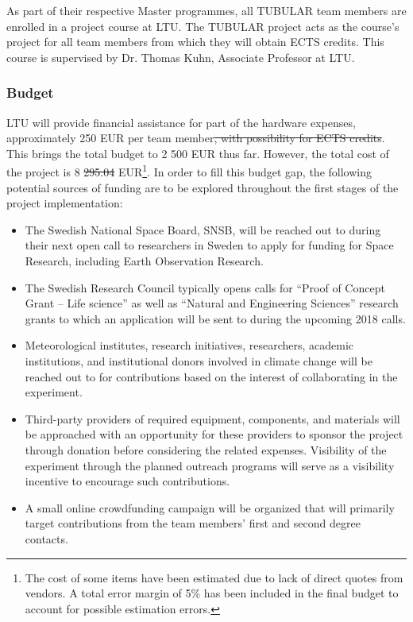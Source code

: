 \documentclass[a4paper,12pt,twoside]{article}
\providecommand{\DIFaddtex}[1]{{\protect\color{blue}\uwave{#1}}} %
\providecommand{\DIFdeltex}[1]{{\protect\color{red}\sout{#1}}}                      %
\providecommand{\DIFaddbegin}{} %
\providecommand{\DIFaddend}{} %
\providecommand{\DIFdelbegin}{} %
\providecommand{\DIFdelend}{} %
\providecommand{\DIFadd}[1]{\texorpdfstring{\DIFaddtex{#1}}{#1}} %
\providecommand{\DIFdel}[1]{\texorpdfstring{\DIFdeltex{#1}}{}} %
\newcommand{\DIFscaledelfig}{0.5}
\newlength{\DIFdelgraphicswidth} %
\newlength{\DIFdelgraphicsheight} %
\newcommand{\DIFaddincludegraphics}[2][]{{\color{blue}\fbox{\DIFOincludegraphics[#1]{#2}}}} %
\newcommand{\DIFdelincludegraphics}[2][]{%
\sbox{\DIFdelgraphicsbox}{\DIFOincludegraphics[#1]{#2}}%
\settoboxwidth{\DIFdelgraphicswidth}{\DIFdelgraphicsbox} %
\settoboxtotalheight{\DIFdelgraphicsheight}{\DIFdelgraphicsbox} %
\scalebox{\DIFscaledelfig}{%
\parbox[b]{\DIFdelgraphicswidth}{\usebox{\DIFdelgraphicsbox}\\[-\baselineskip] \rule{\DIFdelgraphicswidth}{0em}}\llap{\resizebox{\DIFdelgraphicswidth}{\DIFdelgraphicsheight}{%
\setlength{\unitlength}{\DIFdelgraphicswidth}%
\begin{picture}(1,1)%
\thicklines\linethickness{2pt} %
{\color[rgb]{1,0,0}\put(0,0){\framebox(1,1){}}}%
{\color[rgb]{1,0,0}\put(0,0){\line( 1,1){1}}}%
{\color[rgb]{1,0,0}\put(0,1){\line(1,-1){1}}}%
\end{picture}%
}\hspace*{3pt}}} %
} %
\DeclareRobustCommand{\DIFaddbegin}{\DIFOaddbegin \let\includegraphics\DIFaddincludegraphics} %
\DeclareRobustCommand{\DIFaddend}{\DIFOaddend \let\includegraphics\DIFOincludegraphics} %
\DeclareRobustCommand{\DIFdelbegin}{\DIFOdelbegin \let\includegraphics\DIFdelincludegraphics} %
\DeclareRobustCommand{\DIFdelend}{\DIFOaddend \let\includegraphics\DIFOincludegraphics} %
\begin{document}
As part of their respective Master programmes, all TUBULAR team members are enrolled in a project course at LTU. The TUBULAR project acts as the course's project for all team members from which they will obtain ECTS credits. This course is supervised by Dr. Thomas Kuhn, Associate Professor at LTU.

\pagebreak
\subsubsection{Budget}
LTU will provide financial assistance for part of the hardware expenses, approximately 250 EUR per team member\DIFdelbegin \DIFdel{, with possibility for ECTS credits}\DIFdelend . This brings the total budget to 2 500 EUR thus far. However, the total cost of the project is 8 \DIFdelbegin \DIFdel{295.04 }\DIFdelend \DIFaddbegin \DIFadd{376.65 }\DIFaddend EUR\footnote{The cost of some items have been estimated due to lack of direct quotes from vendors. A total error margin of 5\% has been included in the final budget to account for possible estimation errors.}. In order to fill this budget gap, the following potential sources of funding are to be explored throughout the first stages of the project implementation:

\begin{itemize}
    \item The Swedish National Space Board, SNSB, will be reached out to during their next open call to researchers in Sweden to apply for funding for Space Research, including Earth Observation Research.
    \item The Swedish Research Council typically opens calls for \enquote{Proof of Concept Grant – Life science} as well as \enquote{Natural and Engineering Sciences} research grants to which an application will be sent to during the upcoming 2018 calls.
    \item Meteorological institutes, research initiatives, researchers, academic institutions, and institutional donors involved in climate change will be reached out to for contributions based on the interest of collaborating in the experiment.
    \item Third-party providers of required equipment, components, and materials will be approached with an opportunity for these providers to sponsor the project through donation before considering the related expenses. Visibility of the experiment through the planned outreach programs will serve as a visibility incentive to encourage such contributions.
    \item A small online crowdfunding campaign will be organized that will primarily target contributions from the team members' first and second degree contacts.
\end{itemize}
\end{document}
